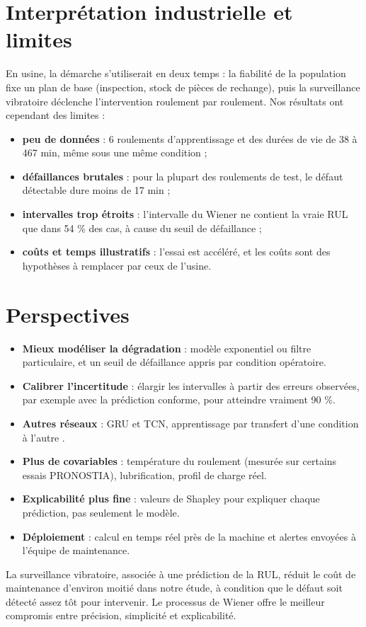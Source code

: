 \section{Interprétation industrielle et limites}

En usine, la démarche s'utiliserait en deux temps : la fiabilité de la population fixe un plan de base (inspection, stock de pièces de rechange), puis la surveillance vibratoire déclenche l'intervention roulement par roulement. Nos résultats ont cependant des limites :
\begin{itemize}
  \item \textbf{peu de données} : 6 roulements d'apprentissage et des durées de vie de 38 à 467 min, même sous une même condition ;
  \item \textbf{défaillances brutales} : pour la plupart des roulements de test, le défaut détectable dure moins de 17 min ;
  \item \textbf{intervalles trop étroits} : l'intervalle du Wiener ne contient la vraie RUL que dans 54 \% des cas, à cause du seuil de défaillance ;
  \item \textbf{coûts et temps illustratifs} : l'essai est accéléré, et les coûts sont des hypothèses à remplacer par ceux de l'usine.
\end{itemize}

\section{Perspectives}

\begin{itemize}
  \item \textbf{Mieux modéliser la dégradation} : modèle exponentiel ou filtre particulaire, et un seuil de défaillance appris par condition opératoire.
  \item \textbf{Calibrer l'incertitude} : élargir les intervalles à partir des erreurs observées, par exemple avec la prédiction conforme, pour atteindre vraiment 90 \%.
  \item \textbf{Autres réseaux} : GRU et TCN, apprentissage par transfert d'une condition à l'autre \cite{dhungana2025}.
  \item \textbf{Plus de covariables} : température du roulement (mesurée sur certains essais PRONOSTIA), lubrification, profil de charge réel.
  \item \textbf{Explicabilité plus fine} : valeurs de Shapley pour expliquer chaque prédiction, pas seulement le modèle.
  \item \textbf{Déploiement} : calcul en temps réel près de la machine et alertes envoyées à l'équipe de maintenance.
\end{itemize}

\chapconclusion
La surveillance vibratoire, associée à une prédiction de la RUL, réduit le coût de maintenance d'environ moitié dans notre étude, à condition que le défaut soit détecté assez tôt pour intervenir. Le processus de Wiener offre le meilleur compromis entre précision, simplicité et explicabilité.
